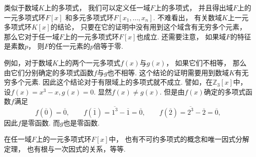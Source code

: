 类似于数域\(K\)上的多项式，
我们可以定义任一域\(F\)上的多项式，
并且得出域\(F\)上的一元多项式环\(F[x]\)
和多元多项式环\(F[x_1,\dotsc,x_n]\).
不难看出，
有关数域\(K\)上一元多项式环\(K[x]\)的结论，
只要在它的证明中没有用到这个域含有无穷多个元素，
那么它对于任一域\(F\)上的一元多项式环\(F[x]\)也成立.
还需要注意，
如果域\(F\)的特征是素数\(p\)，
则\(F\)的任一元素的\(p\)倍等于零.

例如，对于数域\(K\)上的两个一元多项式\(f(x)\)与\(g(x)\)，
如果它们不相等，
那么由它们分别确定的多项式函数\(f\)与\(g\)也不相等.
这个结论的证明需要用到数域\(K\)有无穷多个元素.
因此这个结论对于有限域上的多项式就不成立.
譬如，在\(\mathbb{Z}_3[x]\)中，
设\(f(x)=x^3-x,
g(x)=0\).
显然\(f(x) \neq g(x)\).
但是由\(f(x)\)确定的多项式函数\(f\)满足\[
	f(\overline0)=\overline0, \qquad
	f(\overline1)=\overline{1^3}-\overline1=\overline0, \qquad
	f(\overline2)=\overline{2^3}-\overline2=\overline0,
\]
因此\(f\)是零函数.
而\(g\)也是零函数.

在任一域\(F\)上的一元多项式环\(F[x]\)中，
也有不可约多项式的概念和唯一因式分解定理，
也有根与一次因式的关系，等等.
